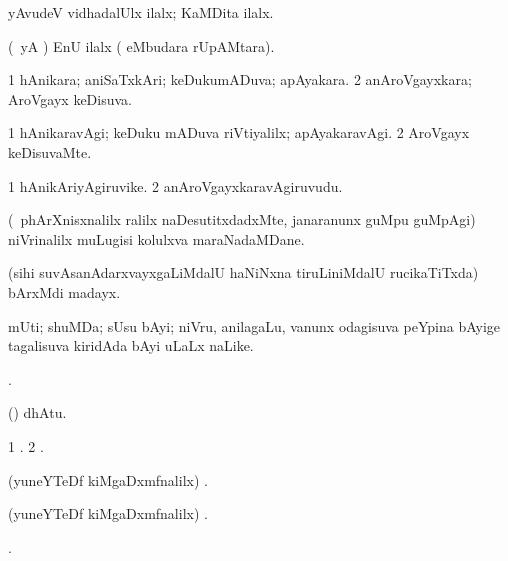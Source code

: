 \bentry
{}
\gl{\kirxvi}
\bmng
yAvudeV vidhadalUlx ilalx; KaMDita ilalx. 
\emng
\eentry

\bentry
{}
\gl{\nA}
\bmng
(\AmA\ yA \pArxM) EnU ilalx ( eMbudara rUpAMtara). 
\emng
\eentry

\bentry
{}
\gl{\gu}
\bmng
\bnum
\num{1} hAnikara; aniSaTxkAri; keDukumADuva; apAyakara. 
\num{2} anAroVgayxkara; AroVgayx keDisuva. 
\enum
\emng
\eentry

\bentry
{}
\gl{\kirxvi}
\bmng
\bnum
\num{1} hAnikaravAgi; keDuku mADuva riVtiyalilx; apAyakaravAgi. 
\num{2} AroVgayx keDisuvaMte. 
\enum
\emng
\eentry

\bentry
{}
\gl{\nA}
\bmng
\bnum
\num{1} hAnikAriyAgiruvike. 
\num{2} anAroVgayxkaravAgiruvudu. 
\enum
\emng
\eentry

\bentry
{}
\gl{\nA}
\expl{\F} 
\bmng
(\kanmu\ phArXnisxnalilx ralilx naDesutitxdadxMte, janaranunx guMpu guMpAgi) niVrinalilx muLugisi kolulxva maraNadaMDane. 
\emng
\eentry

\bentry
{}
\gl{\nA}
\bmng
(sihi suvAsanAdarxvayxgaLiMdalU haNiNxna tiruLiniMdalU rucikaTiTxda) bArxMdi madayx. 
\emng
\eentry

\bentry
{}
\gl{\nA}
\bmng
mUti; shuMDa; sUsu bAyi; niVru, anilagaLu, \mo vanunx odagisuva peYpina bAyige tagalisuva kiridAda bAyi uLaLx naLike. 
\emng
\eentry

\bentry
{}
\gl{\saMkiSx}
\bmng
{}. 
\emng
\eentry

\bentry
{}
\gl{\saMkeV}
\bmng
(\ravi)  dhAtu. 
\emng
\eentry

\bentry
{}
\gl{\saMkiSx}
\bmng
\bnum
\num{1} . 
\num{2} . 
\enum
\emng
\eentry

\bentry
{}
\gl{\saMkiSx}
\bmng
(yuneYTeDf kiMgaDxmfnalilx) . 
\emng
\eentry

\bentry
{}
\gl{\saMkiSx}
\bmng
(yuneYTeDf kiMgaDxmfnalilx) . 
\emng
\eentry

\bentry
{}
\gl{\saMkiSx}
\bmng
{}. 
\emng
\eentry


